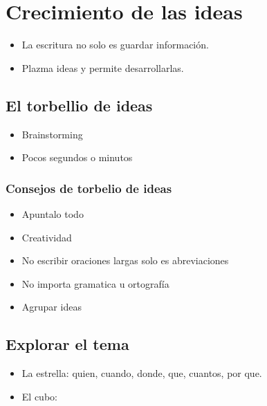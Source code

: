 \documentclass[openany]{book}
\begin{document}
\chapter{Crecimiento de las ideas}
\begin{itemize}
    \item La escritura no solo es guardar información.
    \item Plazma ideas y permite desarrollarlas. 
\end{itemize}
\section{El torbellio de ideas}
\begin{itemize}
    \item Brainstorming 
    \item Pocos segundos o minutos 
\end{itemize}
\subsection{Consejos de torbelio de ideas}
\begin{itemize}
    \item Apuntalo todo 
    \item Creatividad 
    \item No escribir oraciones largas solo es abreviaciones
    \item No importa gramatica u ortografía
    \item Agrupar ideas 
\end{itemize}
\section{Explorar el tema}
\begin{itemize}
    \item La estrella: quien, cuando, donde, que, cuantos, por que.
    \item El cubo: 
\end{itemize}





\end{document}
